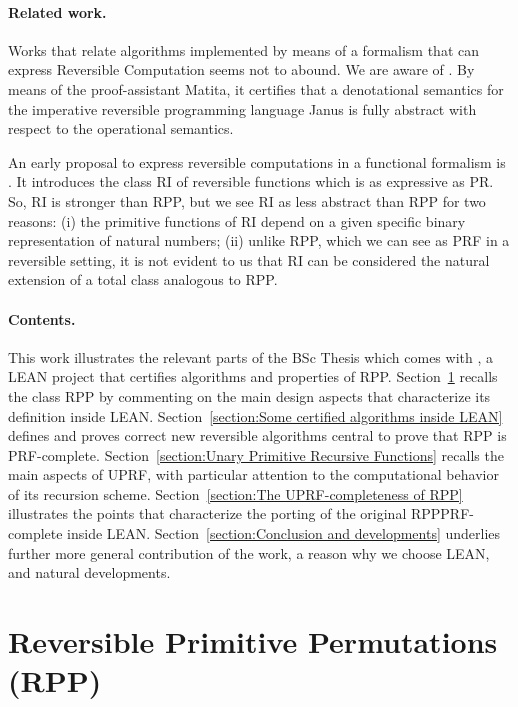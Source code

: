 \documentclass[runningheads]{llncs}
\newcommand{\RPP}{\textsf{RPP}\xspace}
\newcommand{\UPRF}{\textsf{UPRF}\xspace}
\newcommand{\PRF}{\textsf{PRF}\xspace}
\newcommand{\PR}{\textsf{PR}\xspace}
\newcommand{\LEAN}{\textsf{LEAN}\xspace}
\newcommand{\JMF}{\textsf{RI}\xspace} %
\newcommand{\Janus}{\textsf{Janus}\xspace}
\newcommand{\Matita}{\textsf{Matita}\xspace}
\begin{document}
\paragraph{Related work.}
Works that relate algorithms implemented by means of a formalism that can express Reversible Computation seems not to abound. We are aware of \cite{paoliniTYPES2015}. By means of the proof-assistant \Matita \cite{Asperti2007}, it certifies that a denotational semantics for the imperative reversible programming language \Janus \cite[Section 8.3.3]{perumalla2013chc} is fully abstract with respect to the operational semantics.

An early proposal to express reversible computations in a functional formalism is \cite{jacopini89tcs}. It introduces the class \JMF of reversible functions which is as expressive as \PR. So, \JMF is stronger than \RPP, but we see \JMF as less abstract than \RPP for two reasons: (i) the primitive functions of \JMF depend on a given specific binary representation of natural numbers; (ii) unlike \RPP, which we can see as \PRF in a reversible setting, it is not evident to us that \JMF can be considered the natural extension of a total class analogous to \RPP.

\paragraph{Contents.}
This work illustrates the relevant parts of the BSc Thesis \cite{MalettoBSc2021} which comes with \cite{MalettoRPPLEAN2021}, a \LEAN project that certifies algorithms and properties of \RPP.
Section~\ref{section:Reversible Primitive Permutations} recalls the class \RPP by commenting on the main design aspects that characterize its definition inside \LEAN.
Section~\ref{section:Some certified algorithms inside LEAN} defines and proves correct new reversible algorithms central to prove that \RPP is \PRF-complete.
Section~\ref{section:Unary Primitive Recursive Functions} recalls the main aspects of \UPRF, with particular attention to the computational behavior of its recursion scheme.
Section~\ref{section:The UPRF-completeness of RPP} illustrates the points that characterize the porting of the original \RPP \PRF-complete inside \LEAN.
Section~\ref{section:Conclusion and developments} underlies further more general contribution of the work, a reason why we choose \LEAN,  and natural developments.

\section{Reversible Primitive Permutations (\RPP) }
\label{section:Reversible Primitive Permutations}
\end{document}
